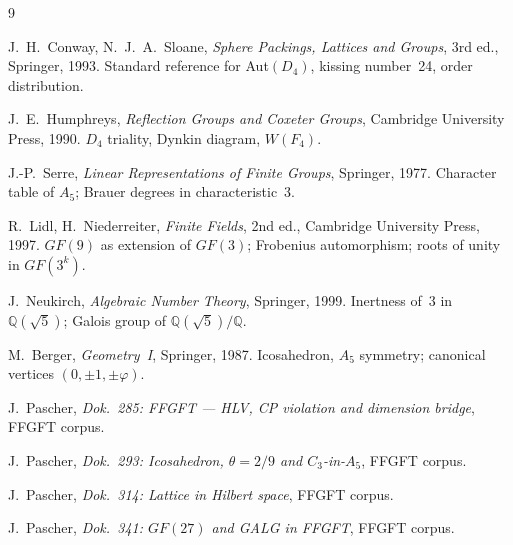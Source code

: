 \begin{thebibliography}{9}

J.~H.~Conway, N.~J.~A.~Sloane,
\textit{Sphere Packings, Lattices and Groups},
3rd ed., Springer, 1993.
Standard reference for Aut$(D_4)$, kissing number~24, order distribution.

J.~E.~Humphreys,
\textit{Reflection Groups and Coxeter Groups},
Cambridge University Press, 1990.
$D_4$ triality, Dynkin diagram, $W(F_4)$.

J.-P.~Serre,
\textit{Linear Representations of Finite Groups},
Springer, 1977.
Character table of $A_5$; Brauer degrees in characteristic~3.

R.~Lidl, H.~Niederreiter,
\textit{Finite Fields},
2nd ed., Cambridge University Press, 1997.
$GF(9)$ as extension of $GF(3)$; Frobenius automorphism; roots of unity in $GF(3^k)$.

J.~Neukirch,
\textit{Algebraic Number Theory},
Springer, 1999.
Inertness of~$3$ in $\mathbb{Q}(\sqrt5)$; Galois group of $\mathbb{Q}(\sqrt5)/\mathbb{Q}$.

M.~Berger,
\textit{Geometry~I},
Springer, 1987.
Icosahedron, $A_5$ symmetry; canonical vertices $(0,\pm1,\pm\varphi)$.

J.~Pascher,
\textit{Dok.~285: FFGFT --- HLV, CP violation and dimension bridge},
FFGFT corpus.

J.~Pascher,
\textit{Dok.~293: Icosahedron, $\theta=2/9$ and $C_3$-in-$A_5$},
FFGFT corpus.

J.~Pascher,
\textit{Dok.~314: Lattice in Hilbert space},
FFGFT corpus.

J.~Pascher,
\textit{Dok.~341: $GF(27)$ and GALG in FFGFT},
FFGFT corpus.

\end{thebibliography}
